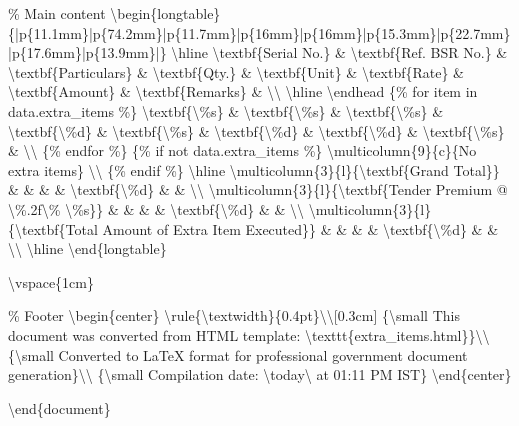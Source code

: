 \% Main content
\textbackslash{}begin\{longtable\}\{|p\{11.1mm\}|p\{74.2mm\}|p\{11.7mm\}|p\{16mm\}|p\{16mm\}|p\{15.3mm\}|p\{22.7mm\}|p\{17.6mm\}|p\{13.9mm\}|\}
\textbackslash{}hline
\textbackslash{}textbf\{Serial No.\} \& \textbackslash{}textbf\{Ref. BSR No.\} \& \textbackslash{}textbf\{Particulars\} \& \textbackslash{}textbf\{Qty.\} \& \textbackslash{}textbf\{Unit\} \& \textbackslash{}textbf\{Rate\} \& \textbackslash{}textbf\{Amount\} \& \textbackslash{}textbf\{Remarks\} \& \textbackslash{}\textbackslash{}
\textbackslash{}hline
\textbackslash{}endhead
\{\% for item in data.extra\_items \%\}
\textbackslash{}textbf\{\textbackslash{}\%s\} \& \textbackslash{}textbf\{\textbackslash{}\%s\} \& \textbackslash{}textbf\{\textbackslash{}\%s\} \& \textbackslash{}textbf\{\textbackslash{}\%d\} \& \textbackslash{}textbf\{\textbackslash{}\%s\} \& \textbackslash{}textbf\{\textbackslash{}\%d\} \& \textbackslash{}textbf\{\textbackslash{}\%d\} \& \textbackslash{}textbf\{\textbackslash{}\%s\} \& \textbackslash{}\textbackslash{}
\{\% endfor \%\}
\{\% if not data.extra\_items \%\}
\textbackslash{}multicolumn\{9\}\{c\}\{No extra items\} \textbackslash{}\textbackslash{}
\{\% endif \%\}
\textbackslash{}hline
\textbackslash{}multicolumn\{3\}\{l\}\{\textbackslash{}textbf\{Grand Total\}\} \& \& \& \& \textbackslash{}textbf\{\textbackslash{}\%d\} \& \& \textbackslash{}\textbackslash{}
\textbackslash{}multicolumn\{3\}\{l\}\{\textbackslash{}textbf\{Tender Premium @ \textbackslash{}\%.2f\textbackslash{}\% \textbackslash{}\%s\}\} \& \& \& \& \textbackslash{}textbf\{\textbackslash{}\%d\} \& \& \textbackslash{}\textbackslash{}
\textbackslash{}multicolumn\{3\}\{l\}\{\textbackslash{}textbf\{Total Amount of Extra Item Executed\}\} \& \& \& \& \textbackslash{}textbf\{\textbackslash{}\%d\} \& \& \textbackslash{}\textbackslash{}
\textbackslash{}hline
\textbackslash{}end\{longtable\}

\textbackslash{}vspace\{1cm\}

\% Footer
\textbackslash{}begin\{center\}
\textbackslash{}rule\{\textbackslash{}textwidth\}\{0.4pt\}\textbackslash{}\textbackslash{}[0.3cm]
\{\textbackslash{}small This document was converted from HTML template: \textbackslash{}texttt\{extra\_items.html\}\}\textbackslash{}\textbackslash{}
\{\textbackslash{}small Converted to LaTeX format for professional government document generation\}\textbackslash{}\textbackslash{}
\{\textbackslash{}small Compilation date: \textbackslash{}today\textbackslash{} at 01:11 PM IST\}
\textbackslash{}end\{center\}

\textbackslash{}end\{document\}